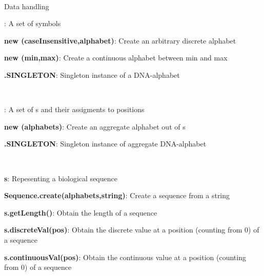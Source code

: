 \documentclass[10pt]{scrartcl}
\newcommand{\entry}[3]{{\bfseries #1#2}: #3}
\begin{document}
\thispagestyle{empty}


\renewcommand{\section}[1]{{
~\vspace{-0.1cm}

\large\sfb #1\vspace{0.1cm}\\}


}
\begin{flushleft}
\footnotesize
\section{Data handling}

\entry{\Alphabet}{}{A set of symbols}

\entry{new \DiscreteAlphabet}{(caseInsensitive,alphabet)}{Create an arbitrary discrete alphabet}

\entry{new \ContinuousAlphabet}{(min,max)}{Create a continuous alphabet between min and max}

\entry{\DNAAlphabet}{.SINGLETON}{Singleton instance of a DNA-alphabet}

~

\entry{\AlphabetContainer}{}{A set of \Alphabet s and their assigments to positions}

\entry{new \AlphabetContainer}{(alphabets)}{Create an aggregate alphabet out of \Alphabet s}

\entry{\DNAAlphabetContainer}{.SINGLETON}{Singleton instance of aggregate DNA-alphabet}


~

\entry{\Sequence}{ s}{Repesenting a biological sequence}

\entry{Sequence}{.create(alphabets,string)}{Create a sequence from a string}

\entry{s}{.getLength()}{Obtain the length of a sequence}

\entry{s}{.discreteVal(pos)}{Obtain the discrete value at a position (counting from 0) of a sequence}

\entry{s}{.continuousVal(pos)}{Obtain the continuous value at a position (counting from 0) of a sequence}

~


\end{flushleft}
\end{document}
